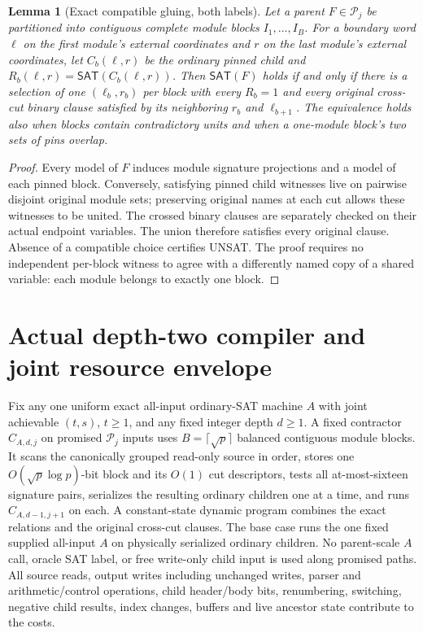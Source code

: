 \documentclass[11pt]{article}
\newtheorem{lemma}[theorem]{Lemma}
\newcommand{\SAT}{\mathsf{SAT}}
\newcommand{\PATH}{\mathcal P}
\begin{document}
\begin{lemma}[Exact compatible gluing, both labels]
Let a parent $F\in\PATH_j$ be partitioned into contiguous complete
module blocks $I_1,\dots,I_B$. For a boundary word $\ell$ on the first
module's external coordinates and $r$ on the last module's external
coordinates, let $C_b(\ell,r)$ be the ordinary pinned child and
$R_b(\ell,r)=\SAT(C_b(\ell,r))$.
Then $\SAT(F)$ holds if and only if there is a selection of one
$(\ell_b,r_b)$ per block with every $R_b=1$ and every original
cross-cut binary clause satisfied by its neighboring $r_b$ and
$\ell_{b+1}$. The equivalence holds also when blocks contain contradictory
units and when a one-module block's two sets of pins overlap.
\end{lemma}
\begin{proof}
Every model of $F$ induces module signature projections and a model
of each pinned block. Conversely, satisfying pinned child witnesses
live on pairwise disjoint original module sets; preserving original
names at each cut allows these witnesses to be united. The crossed
binary clauses are separately checked on their actual endpoint
variables. The union therefore satisfies every original clause.
Absence of a compatible choice certifies UNSAT. The proof requires
no independent per-block witness to agree with a differently named
copy of a shared variable: each module belongs to exactly one block.
\end{proof}

\section{Actual depth-two compiler and joint resource envelope}
Fix any one uniform exact all-input ordinary-SAT machine $A$ with joint
achievable $(t,s)$, $t\ge1$, and any fixed integer depth $d\ge1$.
A fixed contractor $C_{A,d,j}$ on promised $\PATH_j$ inputs uses
$B=\lceil\sqrt p\rceil$ balanced contiguous module blocks. It scans
the canonically grouped read-only source in order, stores one
$O(\sqrt p\log p)$-bit block and its $O(1)$ cut descriptors, tests all
at-most-sixteen signature pairs, serializes the resulting ordinary
children one at a time, and runs $C_{A,d-1,j+1}$ on each.
A constant-state dynamic program combines the exact relations and the
original cross-cut clauses. The base case runs the one fixed
supplied all-input $A$ on physically serialized ordinary children.
No parent-scale $A$ call, oracle SAT label, or free write-only child
input is used along promised paths. All source reads, output writes
including unchanged writes, parser and arithmetic/control operations,
child header/body bits, renumbering, switching, negative child results,
index changes, buffers and live ancestor state contribute to the costs.
\end{document}
